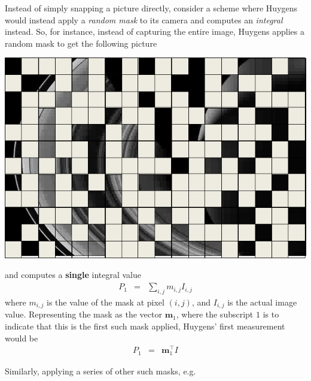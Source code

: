 \begin{enumerate}
Instead of simply snapping a picture directly, consider a scheme where Huygens would instead apply a \textit{random mask} to its camera and computes an \textit{integral} instead.  So, for instance, instead of capturing the entire image, Huygens applies a random mask to get the following picture
\begin{center}
\includegraphics[scale=0.4]{figs/saturnmask1.png}
\end{center}
and computes a \textbf{single} integral value
\begin{eqnarray}
P_1 &  = & \sum_{i,j} m_{i,j} I_{i,j}
\end{eqnarray}
where $m_{i,j}$ is the value of the mask at pixel $(i,j)$, and $I_{i,j}$ is the actual image value. Representing the mask as the vector $\mathbf{m}_1$, where the subscript $1$ is to indicate that this is the first such mask applied, Huygens' first measurement would be
\begin{eqnarray}
P_1 & = & \mathbf{m}_1^\top I
\end{eqnarray}

Similarly, applying a series of other such masks, e.g. 


\end{enumerate}
